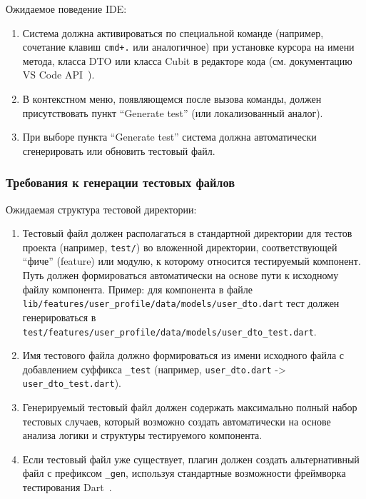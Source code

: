 \documentclass[14pt, russian]{scrartcl}
\newcommand{\enq}[1]{\enquote{#1}}
\begin{document}
Ожидаемое поведение IDE:

\begin{enumerate}
    \item Система должна активироваться по специальной команде (например, сочетание клавиш \texttt{cmd+.} или аналогичное) при установке курсора на имени метода, класса DTO или класса Cubit в редакторе кода (см. документацию VS Code API~\cite{VSCodeAPI}).
    \item В контекстном меню, появляющемся после вызова команды, должен присутствовать пункт \enq{Generate test} (или локализованный аналог).
    \item При выборе пункта \enq{Generate test} система должна автоматически сгенерировать или обновить тестовый файл.
\end{enumerate}

\subsubsection{Требования к генерации тестовых файлов}

Ожидаемая структура тестовой директории:

\begin{enumerate}
    \item Тестовый файл должен располагаться в стандартной директории для тестов проекта (например, \texttt{test/}) во вложенной директории, соответствующей \enq{фиче} (feature) или модулю, к которому относится тестируемый компонент. Путь должен формироваться автоматически на основе пути к исходному файлу компонента. Пример: для компонента в файле \texttt{lib/features/user\_profile/data/models/user\_dto.dart} тест должен генерироваться в \\ \texttt{test/features/user\_profile/data/models/user\_dto\_test.dart}.
    \item Имя тестового файла должно формироваться из имени исходного файла с добавлением суффикса \texttt{\_test} (например, \texttt{user\_dto.dart} -> \texttt{user\_dto\_test.dart}).
    \item Генерируемый тестовый файл должен содержать максимально полный набор тестовых случаев, который возможно создать автоматически на основе анализа логики и структуры тестируемого компонента.
    \item Если тестовый файл уже существует, плагин должен создать альтернативный файл с префиксом \texttt{\_gen}, используя стандартные возможности фреймворка тестирования Dart~\cite{DartTestPackage}.
\end{enumerate}
\end{document}
